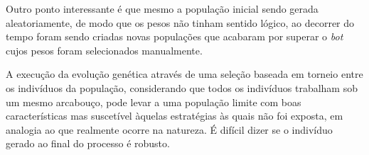 \documentclass[a4paper,titlepage,11pt]{article}
\begin{document}
Outro ponto interessante é que mesmo a população inicial sendo gerada aleatoriamente, de modo que os pesos não tinham sentido lógico, ao decorrer do tempo foram sendo criadas novas populações que acabaram por superar o {\em bot} cujos pesos foram selecionados manualmente.

A execução da evolução genética através de uma seleção baseada em torneio entre os indivíduos da população, considerando que todos os indivíduos trabalham sob um mesmo arcabouço, pode levar a uma população limite com boas características mas suscetível àquelas estratégias às quais não foi exposta, em analogia ao que realmente ocorre na natureza. É difícil dizer se o indivíduo gerado ao final do processo é robusto.
\end{document}
